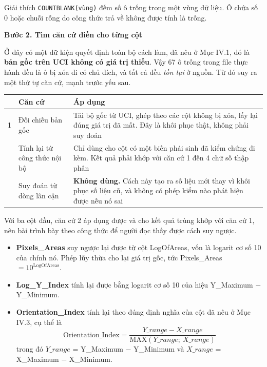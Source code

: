 \documentclass[12pt]{article}
\begin{document}
\begin{guidelinebox}{Giải thích}
\texttt{COUNTBLANK(vùng)} đếm số ô trống trong một vùng dữ liệu. Ô chứa số 0 hoặc chuỗi rỗng do công thức trả về không được tính là trống.
\end{guidelinebox}

\noindent
\textbf{Bước 2. Tìm căn cứ điền cho từng cột}

\noindent
Ở đây có một dữ kiện quyết định toàn bộ cách làm, đã nêu ở Mục IV.1, đó là \textbf{bản gốc trên UCI không có giá trị thiếu}. Vậy 67 ô trống trong file thực hành đều là ô bị xóa đi có chủ đích, và tất cả đều \emph{tồn tại} ở nguồn. Từ đó suy ra một thứ tự căn cứ, mạnh trước yếu sau.

\begin{center}
\small
\begin{tabular}{@{}p{0.6cm} p{5.0cm} p{9.6cm}@{}}
\toprule
 & \textbf{Căn cứ} & \textbf{Áp dụng} \\
\midrule
1 & Đối chiếu bản gốc & Tải bộ gốc từ UCI, ghép theo các cột không bị xóa, lấy lại đúng giá trị đã mất. Đây là khôi phục thật, không phải suy đoán \\
\addlinespace[3pt]
2 & Tính lại từ công thức nội bộ & Chỉ dùng cho cột có một biến phái sinh đã kiểm chứng đi kèm. Kết quả phải khớp với căn cứ 1 đến 4 chữ số thập phân \\
\addlinespace[3pt]
3 & Suy đoán từ dòng lân cận & \textbf{Không dùng.} Cách này tạo ra số liệu mới thay vì khôi phục số liệu cũ, và không có phép kiểm nào phát hiện được nếu nó sai \\
\bottomrule
\end{tabular}
\end{center}

\noindent
Với ba cột đầu, căn cứ 2 áp dụng được và cho kết quả trùng khớp với căn cứ 1, nên bài trình bày theo công thức để người đọc thấy được cách suy ngược.

\begin{itemize}
    \item \textbf{Pixels\_Areas} suy ngược lại được từ cột LogOfAreas, vốn là logarit cơ số 10 của chính nó. Phép lũy thừa cho lại giá trị gốc, tức Pixels\_Areas $= 10^{\text{LogOfAreas}}$.
    \item \textbf{Log\_Y\_Index} tính lại được bằng logarit cơ số 10 của hiệu Y\_Maximum $-$ Y\_Minimum.
    \item \textbf{Orientation\_Index} tính lại theo đúng định nghĩa của cột đã nêu ở Mục IV.3, cụ thể là
    $$\text{Orientation\_Index} = \frac{Y\_range - X\_range}{\mathrm{MAX}(Y\_range;\ X\_range)}$$
    trong đó $Y\_range$ = Y\_Maximum $-$ Y\_Minimum và $X\_range$ = X\_Maximum $-$ X\_Minimum.
\end{itemize}
\end{document}
